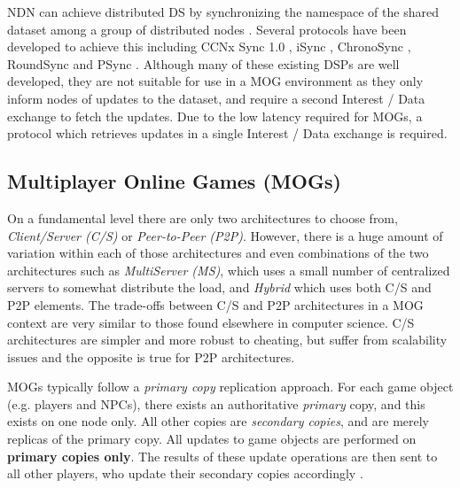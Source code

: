 NDN can achieve distributed DS by synchronizing the namespace of the shared dataset among a group of distributed nodes \cite{sync-survey}. Several protocols have been developed to achieve this including CCNx Sync 1.0 \cite{ccnx-sync}, iSync \cite{isync}, ChronoSync \cite{chronosync}, RoundSync \cite{roundsync} and PSync \cite{psync}. Although many of these existing DSPs are well developed, they are not suitable for use in a MOG environment as they only inform nodes of updates to the dataset, and require a second Interest / Data exchange to fetch the updates. Due to the low latency required for MOGs, a protocol which retrieves updates in a single Interest / Data exchange is required.



\subsection{Multiplayer Online Games (MOGs)}
On a fundamental level there are only two architectures to choose from, \textit{Client/Server (C/S)} or \textit{Peer-to-Peer (P2P)}. However, there is a huge amount of variation within each of those architectures and even combinations of the two architectures such as \textit{MultiServer (MS)}, which uses a small number of centralized servers to somewhat distribute the load, and \textit{Hybrid} which uses both C/S and P2P elements. The trade-offs between C/S and P2P architectures in a MOG context are very similar to those found elsewhere in computer science. C/S architectures are simpler and more robust to cheating, but suffer from scalability issues and the opposite is true for P2P architectures.

MOGs typically follow a \textit{primary copy} replication approach. For each game object (e.g. players and NPCs), there exists an authoritative \textit{primary} copy, and this exists on one node only. All other copies are \textit{secondary copies}, and are merely replicas of the primary copy. All updates to game objects are performed on \textbf{primary copies only}. The results of these update operations are then sent to all other players, who update their secondary copies accordingly \cite{p2p-mog-survey}.

